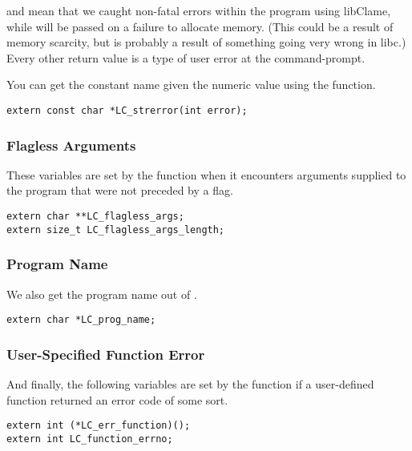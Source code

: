  and  mean that we caught non-fatal errors within the program using libClame, while  will be passed on a failure to allocate memory. (This could be a result of memory scarcity, but is probably a result of something going very wrong in libc.) Every other return value is a type of user error at the command-prompt.

You can get the constant name given the numeric value using the  function.

\begin{verbatim}
extern const char *LC_strerror(int error);
\end{verbatim}

\subsubsection{Flagless Arguments}

These variables are set by the  function when it encounters arguments supplied to the program that were not preceded by a flag.

\begin{verbatim}
extern char **LC_flagless_args;
extern size_t LC_flagless_args_length;
\end{verbatim}

\subsubsection{Program Name}

We also get the program name out of .

\begin{verbatim}
extern char *LC_prog_name;
\end{verbatim}

\subsubsection{User-Specified Function Error}

And finally, the following variables are set by the  function if a user-defined function returned an error code of some sort.

\begin{verbatim}
extern int (*LC_err_function)();
extern int LC_function_errno;
\end{verbatim}
